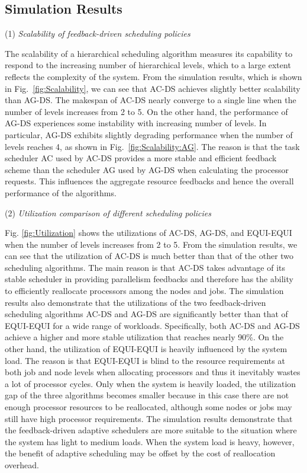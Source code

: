 \documentclass[10pt, a4paper]{article}
\newcommand{\figref}[1]         {Fig.~\ref{fig:#1}}
\begin{document}
\subsection{Simulation Results}

\indent\indent(1) \emph{Scalability of feedback-driven scheduling policies}

The scalability of a hierarchical scheduling algorithm measures its capability to respond to the
increasing number of hierarchical levels, which to a large extent reflects the complexity of the
system. From the simulation results, which is shown in \figref{Scalability}, we can see that AC-DS
achieves slightly better scalability than AG-DS. The makespan of AC-DS nearly converge to a single
line when the number of levels increases from 2 to 5. On the other hand, the performance of AG-DS
experiences some instability with increasing number of levels. In particular, AG-DS exhibits
slightly degrading performance when the number of levels reaches 4, as shown in
\figref{Scalability:AG}. The reason is that the task scheduler AC used by AC-DS provides a more
stable and efficient feedback scheme than the scheduler AG used by AG-DS when calculating the
processor requests. This influences the aggregate resource feedbacks and hence the overall
performance of the algorithms.

\indent(2) \emph{Utilization comparison of different scheduling policies}

Fig. \ref{fig:Utilization} shows the utilizations of AC-DS, AG-DS, and EQUI-EQUI when the number of
levels increases from 2 to 5. From the simulation results, we can see that the utilization of AC-DS
is much better than that of the other two scheduling algorithms. The main reason is that AC-DS
takes advantage of its stable scheduler in providing parallelism feedbacks and therefore has the
ability to efficiently reallocate processors among the nodes and jobs. The simulation results also
demonstrate that the utilizations of the two feedback-driven scheduling algorithms AC-DS and AG-DS
are significantly better than that of EQUI-EQUI for a wide range of workloads. Specifically, both
AC-DS and AG-DS achieve a higher and more stable utilization that reaches nearly 90\%. On the other
hand, the utilization of EQUI-EQUI is heavily influenced by the system load. The reason is that
EQUI-EQUI is blind to the resource requirements at both job and node levels when allocating
processors and thus it inevitably wastes a lot of processor cycles. Only when the system is heavily
loaded, the utilization gap of the three algorithms becomes smaller because in this case there are
not enough processor resources to be reallocated, although some nodes or jobs may still have high
processor requirements. The simulation results demonstrate that the feedback-driven adaptive
schedulers are more suitable to the situation where the system has light to medium loads. When the
system load is heavy, however, the benefit of adaptive scheduling may be offset by the cost of
reallocation overhead.
\end{document}

